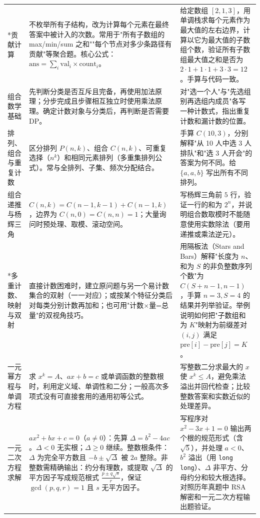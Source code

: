 \documentclass[a4paper,11pt]{article}
\newcommand{\code}[1]{\texttt{#1}}
\begin{document}
\begin{longtable}{L{2.4cm} L{7.5cm} L{6.8cm}}
*贡献计算
& 不枚举所有子结构，改为计算每个元素在最终答案中被计入的次数。常用于"所有子数组的 max/min/sum 之和""每个节点对多少条路径有贡献"等聚合题。核心公式：$\text{ans}=\sum_i \text{val}_i\times\text{count}_i$。
& 给定数组 $[2,1,3]$，用单调栈求每个元素作为最大值的左右边界，计算以它为最大值的子数组个数，验证所有子数组最大值之和是否为 $2\cdot1+1\cdot1+3\cdot3=12$。手算与代码一致。 \\[2mm]

组合数学基础
& 先判断分类是否互斥且完备，再使用加法原理；分步完成且步骤相互独立时使用乘法原理。确定计数对象与分类后，再判断是否需要 DP。
& 对"选一个人"与"先选组别再选组内成员"各写一种计数式，指出重复计数和漏计数的位置。 \\[2mm]

排列、组合与重复计数
& 区分排列 $P(n,k)$、组合 $C(n,k)$、可重复选择（$n^k$）和相同元素排列（多重集排列公式）。常与全排列、子集、频次分配结合。
& 手算 $C(10,3)$，分别解释"从 10 人中选 3 人排队"和"选 3 人开会"的答案为何不同。给 $\{a,a,b\}$ 写出所有不同排列。 \\[2mm]

组合递推与杨辉三角
& $C(n,k)=C(n-1,k-1)+C(n-1,k)$，边界为 $C(n,0)=C(n,n)=1$；大量询问时预处理、取模、滚动空间。
& 写杨辉三角前 $5$ 行，验证一行的和为 $2^n$，并说明组合数取模时不能随意使用实数除法（要用递推或乘法逆元）。 \\[2mm]

*多重计数、映射与双射
& 直接计数困难时，建立原问题与另一个易计数集合的双射（一一对应）；或按某个特征分类后对每类分别计数再加和；也可用"计数$\times$量=总量"的双视角技巧。
& 用隔板法（Stars and Bars）解释"长度为 $n$、和为 $S$ 的非负整数序列个数"为 $C(S+n-1,n-1)$，手算 $n=3,S=4$ 的结果并列举验证。举例说明如何把"子数组和为 $K$"映射为前缀差对 $(i,j)$ 满足 $\text{pre}[i]-\text{pre}[j]=K$。 \\[2mm]

一元幂方程与单调方程
& 求 $x^k=A$、$ax+b=c$ 或单调函数的整数根时，利用定义域、单调性和二分；一般高次多项式没有可直接套用的通用初等公式。
& 写整数二分求最大的 $x$ 使 $x^k\le A$，避免乘法溢出并回代检查；比较整数答案和实数近似的处理差异。 \\[2mm]

一元二次方程求解
& $ax^2+bx+c=0$（$a\neq 0$）：先算 $\Delta=b^2-4ac$。$\Delta<0$ 无实根；$\Delta\ge 0$ 继续。整数根条件：$\Delta$ 为完全平方数且 $-b\pm\sqrt{\Delta}$ 被 $2a$ 整除。非整数需精确输出：约分有理数，或提取 $\sqrt{\Delta}$ 的平方因子写成规范根式 $\frac{p\pm q\sqrt{s}}{r}$，保证 $\gcd(p,q,r)=1$ 且 $s$ 无平方因子。
& 写程序对 $x^2-3x+1=0$ 输出两个根的规范形式（含 $\sqrt{5}$），并处理 $a<0$、$b^2$ 溢出（用 \code{long long}）、$\Delta$ 非平方、分母约分和较大根选择。对照历年真题中 RSA 解密和一元二次方程输出题验证。 \\[2mm]


\end{longtable}
\end{document}
